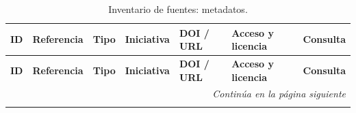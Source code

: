 \begin{landscape}
\footnotesize
\setlength{\tabcolsep}{4pt}
\renewcommand{\arraystretch}{1.15}
\begin{longtable}{@{}p{0.9cm}p{5.9cm}p{2.6cm}p{2.5cm}p{5.0cm}p{2.3cm}p{1.8cm}@{}}
\caption{Inventario de fuentes: metadatos.}\label{tab:inv-meta}\\
\toprule
\textbf{ID} & \textbf{Referencia} & \textbf{Tipo} & \textbf{Iniciativa} & \textbf{DOI / URL} & \textbf{Acceso y licencia} & \textbf{Consulta}\\
\midrule
\endfirsthead
\toprule
\textbf{ID} & \textbf{Referencia} & \textbf{Tipo} & \textbf{Iniciativa} & \textbf{DOI / URL} & \textbf{Acceso y licencia} & \textbf{Consulta}\\
\midrule
\endhead
\midrule
\multicolumn{7}{r}{\emph{Continúa en la página siguiente}}\\
\endfoot
\bottomrule
\endlastfoot


\end{longtable}
\end{landscape}
